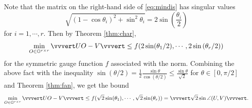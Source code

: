 \documentclass[reqno]{amsart}
\DeclareMathOperator{\diag}{diag}
\newcommand{\T}{\mathrm{T}}
\theoremstyle{plain}
\theoremstyle{definition}
\begin{document}
Note that the matrix on the right-hand side of \eqref{eq:mindis} has singular values $$\sqrt{(1-\cos\theta_i)^2 + \sin^2\theta_i} = 2\sin\left(\frac{\theta_i}{2} \right)$$ for $i=1,\cdots, r$. Then by Theorem \ref{thm:char},
\begin{equation*}
\min_{O\in \mathbb{O}^{r\times r}} \vvvert UO- V\vvvert \le f(2 \sin(\theta_1/2), \cdots,2 \sin\left(\theta_r/2)\right)
\end{equation*}  for the symmetric gauge function $f$ associated with the norm. Combining the above fact with the inequality $\sin (\theta/2) =\frac{1}{2} \frac{\sin \theta}{\cos(\theta/2)} \le \frac{\sin\theta}{\sqrt 2}$ for $\theta \in [0,\pi/2]$ and Theorem \ref{thm:fan}, we get the bound 
\begin{equation*}
\min_{O\in \mathbb{O}^{r\times r}} \vvvert UO- V\vvvert \le f(\sqrt{2} \sin(\theta_1), \cdots,\sqrt{2} \sin(\theta_r)) =\vvvert \sqrt{2}\sin\angle (U,V)  \vvvert.
\end{equation*}


\end{document}
